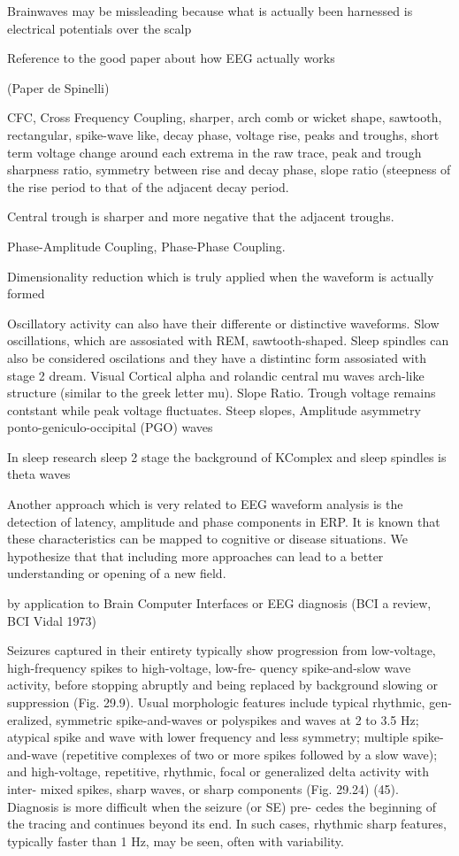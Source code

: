 \documentclass[sensors,article,submit,moreauthors,pdftex,10pt,a4paper]{mdpi}
\begin{document}
Brainwaves may be missleading because what is actually been harnessed is electrical potentials over the scalp

Reference to the good paper about how EEG actually works

(Paper de Spinelli) 

CFC, Cross Frequency Coupling, sharper, arch comb or wicket shape, sawtooth, rectangular, spike-wave like, decay phase, voltage rise, peaks and troughs, short term voltage change around each extrema in the raw trace, peak and trough sharpness ratio, symmetry between rise and decay phase, slope ratio (steepness of the rise period to that of the adjacent decay period.

Central trough is sharper and more negative that the adjacent troughs.

Phase-Amplitude Coupling, Phase-Phase Coupling.


Dimensionality reduction which is truly applied when the waveform is actually formed

Oscillatory activity can also have their differente or distinctive waveforms.  Slow oscillations, which are assosiated with REM, sawtooth-shaped.
Sleep spindles can also be considered oscilations and they have a distintinc form assosiated with stage 2 dream.
Visual Cortical alpha and rolandic central mu waves arch-like structure (similar to the greek letter mu).  Slope Ratio.  Trough voltage remains contstant while peak voltage fluctuates.   Steep slopes,   Amplitude asymmetry 
ponto-geniculo-occipital
(PGO) waves

In sleep research sleep 2 stage the background of KComplex and sleep spindles is theta waves

Another approach which is very related to EEG waveform analysis is the detection of latency, amplitude and phase components in ERP.  It is known that these characteristics can be mapped to cognitive or disease situations.  We hypothesize that that including more approaches can lead to a better understanding or opening of a new field.

by application to Brain Computer Interfaces or EEG diagnosis (BCI a review, BCI Vidal 1973)

Seizures captured in their entirety typically show progression from low-voltage, high-frequency spikes to high-voltage, low-fre- quency spike-and-slow wave activity, before stopping abruptly and being replaced by background slowing or suppression (Fig. 29.9). Usual morphologic features include typical rhythmic, gen- eralized, symmetric spike-and-waves or polyspikes and waves at 2 to 3.5 Hz; atypical spike and wave with lower frequency and less symmetry; multiple spike-and-wave (repetitive complexes of two or more spikes followed by a slow wave); and high-voltage, repetitive, rhythmic, focal or generalized delta activity with inter- mixed spikes, sharp waves, or sharp components (Fig. 29.24) (45). Diagnosis is more difficult when the seizure (or SE) pre- cedes the beginning of the tracing and continues beyond its end. In such cases, rhythmic sharp features, typically faster than 1 Hz, may be seen, often with variability.
\end{document}
